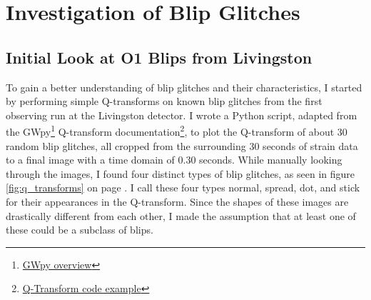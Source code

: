 \documentclass[a4paper]{article}
\begin{document}
\section{Investigation of Blip Glitches}

\subsection{Initial Look at O1 Blips from Livingston} \label{investigation}

To gain a better understanding of blip glitches and their characteristics, I started by performing simple Q-transforms on known blip glitches from the first observing run at the Livingston detector. I wrote a Python script, adapted from the GWpy\footnote{\href{https://gwpy.github.io/docs/stable/overview.html}{GWpy overview}} Q-transform documentation\footnote{\href{https://gwpy.github.io/docs/stable/examples/timeseries/qscan.html}{Q-Transform code example}}, to plot the Q-transform of about 30 random blip glitches, all cropped from the surrounding 30 seconds of strain data to a final image with a time domain of 0.30 seconds. While manually looking through the images, I found four distinct types of blip glitches, as seen in figure \ref{fig:q_transforms} on page \pageref{fig:q_transforms}. I call these four types normal, spread, dot, and stick for their appearances in the Q-transform. Since the shapes of these images are drastically different from each other, I made the assumption that at least one of these could be a subclass of blips.
\end{document}

